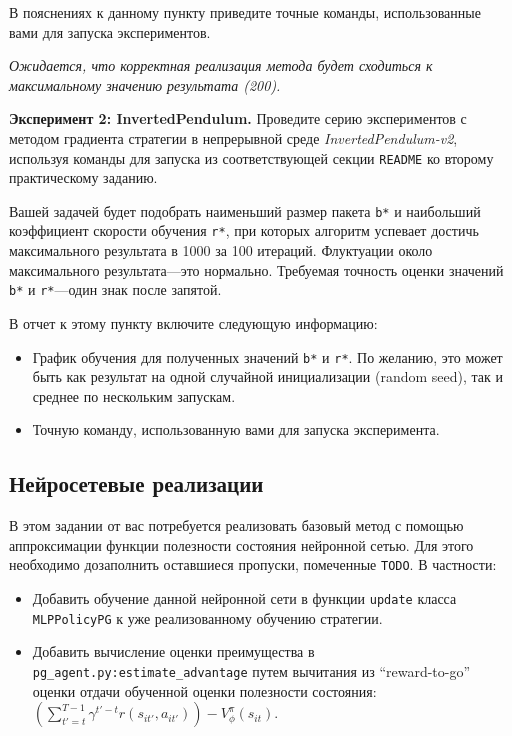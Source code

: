 \documentclass[12pt, oneside]{article}
\begin{document}
В пояснениях к данному пункту приведите точные команды, использованные вами для запуска экспериментов.

\textit{Ожидается, что корректная реализация метода будет сходиться к максимальному значению результата (200).}

\textbf{Эксперимент 2: InvertedPendulum.} Проведите серию экспериментов с методом градиента стратегии в непрерывной среде \textit{InvertedPendulum-v2}, используя команды для запуска из соответствующей секции \verb|README| ко второму практическому заданию.

Вашей задачей будет подобрать наименьший размер пакета \verb|b*| и наибольший коэффициент скорости обучения \verb|r*|, при которых алгоритм успевает достичь максимального результата в 1000 за 100 итераций. Флуктуации около максимального результата---это нормально. Требуемая точность оценки значений \verb|b*| и \verb|r*|---один знак после запятой.

В отчет к этому пункту включите следующую информацию:

\begin{itemize}
    \item График обучения для полученных значений \verb|b*| и \verb|r*|. По желанию, это может быть как результат на одной случайной инициализации (random seed), так и среднее по нескольким запускам.
    \item Точную команду, использованную вами для запуска эксперимента.
\end{itemize}

\subsection{Нейросетевые реализации}

В этом задании от вас потребуется реализовать базовый метод с помощью аппроксимации функции полезности состояния нейронной сетью. Для этого необходимо дозаполнить оставшиеся пропуски, помеченные \verb|TODO|. В частности:

\begin{itemize}
    \item Добавить обучение данной нейронной сети в функции \verb|update| класса \verb|MLPPolicyPG| к уже реализованному обучению стратегии.
    \item Добавить вычисление оценки преимущества в \verb|pg_agent.py:estimate_advantage| путем вычитания из ``reward-to-go'' оценки отдачи обученной оценки полезности состояния: $\left( \sum_{t' = t}^{T - 1} {\gamma^{t'-t} r(s_{it'}, a_{it'})} \right) - V_\phi^\pi (s_{it})$.
\end{itemize}
\end{document}
